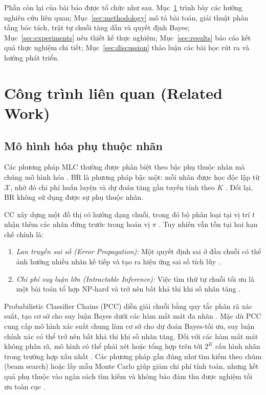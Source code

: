 \documentclass[11pt,a4paper]{article}
\begin{document}
Phần còn lại của bài báo được tổ chức như sau. Mục~\ref{sec:related_work} trình bày các hướng nghiên cứu liên quan; Mục~\ref{sec:methodology} mô tả bài toán, giải thuật phân tầng bóc tách, trật tự chuỗi tăng dần và quyết định Bayes; Mục~\ref{sec:experiments} nêu thiết kế thực nghiệm; Mục~\ref{sec:results} báo cáo kết quả thực nghiệm chi tiết; Mục~\ref{sec:discussion} thảo luận các bài học rút ra và hướng phát triển.

\section{Công trình liên quan (Related Work)}
\label{sec:related_work}

\subsection{Mô hình hóa phụ thuộc nhãn}
Các phương pháp MLC thường được phân biệt theo bậc phụ thuộc nhãn mà chúng mô hình hóa \cite{zhang2014review}. BR là phương pháp bậc một: mỗi nhãn được học độc lập từ $\mathcal{X}$, nhờ đó chi phí huấn luyện và dự đoán tăng gần tuyến tính theo $K$ \cite{zhang2018binary}. Đổi lại, BR không sử dụng được sự phụ thuộc nhãn.

CC xây dựng một đồ thị có hướng dạng chuỗi, trong đó bộ phân loại tại vị trí $t$ nhận thêm các nhãn đứng trước trong hoán vị $\pi$ \cite{read2011classifier}. Tuy nhiên vẫn tồn tại hai hạn chế chính là:
\begin{enumerate}
    \item \textit{Lan truyền sai số (Error Propagation):} Một quyết định sai ở đầu chuỗi có thể ảnh hưởng nhiều nhãn kế tiếp và tạo ra hiệu ứng sai số tích lũy \cite{read2011classifier, senge2014reliable}.
    \item \textit{Chi phí suy luận lớn (Intractable Inference):} Việc tìm thứ tự chuỗi tối ưu là một bài toán tổ hợp NP-hard và trở nên bất khả thi khi số nhãn tăng \cite{dembczynski2010bayes, dembczynski2012bayes}.
\end{enumerate}

Probabilistic Classifier Chains (PCC) diễn giải chuỗi bằng quy tắc phân rã xác suất, tạo cơ sở cho suy luận Bayes dưới các hàm mất mát đa nhãn \cite{dembczynski2010bayes, dembczynski2012bayes}. Mặc dù PCC cung cấp mô hình xác suất chung làm cơ sở cho dự đoán Bayes-tối ưu, suy luận chính xác có thể trở nên bất khả thi khi số nhãn tăng. Đối với các hàm mất mát không phân rã, mô hình có thể phải xét hoặc tổng hợp trên tới $2^K$ cấu hình nhãn trong trường hợp xấu nhất \cite{dembczynski2012bayes}. Các phương pháp gần đúng như tìm kiếm theo chùm (beam search) hoặc lấy mẫu Monte Carlo giúp giảm chi phí tính toán, nhưng kết quả phụ thuộc vào ngân sách tìm kiếm và không bảo đảm thu được nghiệm tối ưu toàn cục \cite{read2014efficient}.
\end{document}
